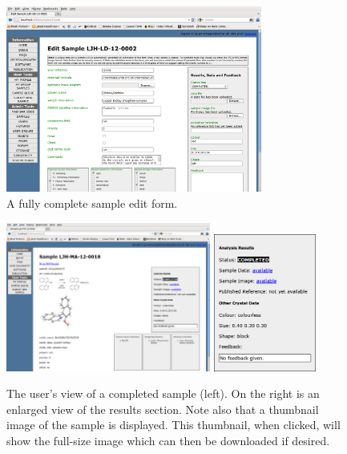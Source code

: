 \documentclass[12pt,twoside]{article}
\begin{document}
\begin{enumerate}[(i)]
\begin{figure}[!htb]
\begin{center}
\includegraphics[width=0.75\textwidth]{sampleeditform}
\caption{A fully complete sample edit form.\label{fig:sampleeditform}}
\end{center}
\end{figure}

\begin{figure}[!htb]
\begin{center}
\includegraphics[width=0.60\textwidth]{sampleshowpage}
\quad
\includegraphics[width=0.30\textwidth]{sampleresults}
\caption{The user's view of a completed sample (left). On the right is
an enlarged view of the results section. Note also that a thumbnail image
of the sample is displayed. This thumbnail, when clicked, will show the
full-size image which can then be downloaded if desired.\label{fig:sampleshowpage}}
\end{center}
\end{figure}


\end{enumerate}
\end{document}
